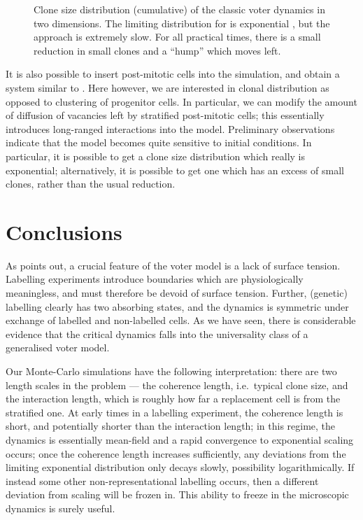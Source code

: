 \documentclass[10pt,english]{report}
\begin{document}
\begin{figure}[htb]
	\centering
	\caption{\label{fig:voter-clone-size-distribution}Clone size distribution (cumulative) of the classic voter dynamics in two dimensions. The limiting distribution for is exponential \citep{bramson&griffeath}, but the approach is extremely slow. For all practical times, there is a small reduction in small clones and a ``hump'' which moves left.}
\end{figure}

It is also possible to insert post-mitotic cells into the simulation, and obtain a system similar to \citet{klein08}. Here however, we are interested in clonal distribution as opposed to clustering of progenitor cells. In particular, we can modify the amount of diffusion of vacancies left by stratified post-mitotic cells; this essentially introduces long-ranged interactions into the model. Preliminary observations indicate that the model becomes quite sensitive to initial conditions. In particular, it is possible to get a clone size distribution which really is exponential; alternatively, it is possible to get one which has an excess of small clones, rather than the usual reduction.

\section{Conclusions}

As \citet{dornic01} points out, a crucial feature of the voter model is a lack of surface tension. Labelling experiments introduce boundaries which are physiologically meaningless, and must therefore be devoid of surface tension. Further, (genetic) labelling clearly has two absorbing states, and the dynamics is symmetric under exchange of labelled and non-labelled cells. As we have seen, there is considerable evidence that the critical dynamics falls into the universality class of a generalised voter model.

Our Monte-Carlo simulations have the following interpretation: there are two length scales in the problem --- the coherence length, i.e.\ typical clone size, and the interaction length, which is roughly how far a replacement cell is from the stratified one. At early times in a labelling experiment, the coherence length is short, and potentially shorter than the interaction length; in this regime, the dynamics is essentially mean-field and a rapid convergence to exponential scaling occurs; once the coherence length increases sufficiently, any deviations from the limiting exponential distribution only decays slowly, possibility logarithmically. If instead some other non-representational labelling occurs, then a different deviation from scaling will be frozen in. This ability to freeze in the microscopic dynamics is surely useful.
\end{document}
